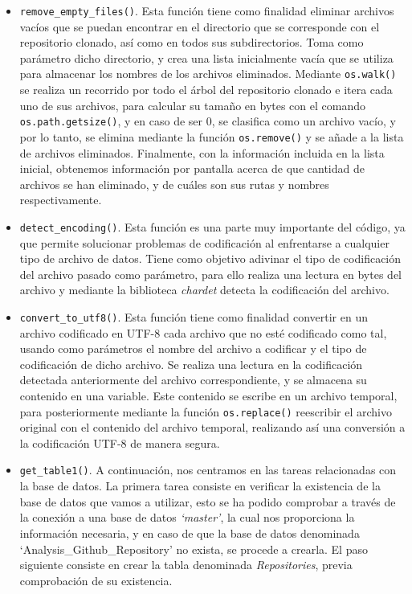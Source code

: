 \documentclass[a4paper, 12pt]{book}
\begin{document}
\begin{itemize}
  \item \texttt{remove\_empty\_files()}. Esta función tiene como finalidad eliminar archivos vacíos que se puedan encontrar en el directorio que se corresponde con el repositorio clonado, así como en todos sus subdirectorios.
  Toma como parámetro dicho directorio, y crea una lista inicialmente vacía que se utiliza para almacenar los nombres de los archivos eliminados. Mediante \texttt{os.walk()} se realiza un recorrido por todo el árbol del repositorio
  clonado e itera cada uno de sus archivos, para calcular su tamaño en bytes con el comando \texttt{os.path.getsize()}, y en caso de ser 0, se clasifica como un archivo vacío, y por lo tanto, se elimina mediante la función \texttt{os.remove()}
  y se añade a la lista de archivos eliminados. Finalmente, con la información incluida en la lista inicial, obtenemos información por pantalla acerca de que cantidad de archivos se han eliminado, y de cuáles son sus rutas y nombres respectivamente.
  
  \item \texttt{detect\_encoding()}. Esta función es una parte muy importante del código, ya que permite solucionar problemas de codificación al enfrentarse a cualquier tipo de archivo de datos. Tiene como objetivo adivinar el tipo de
  codificación del archivo pasado como parámetro, para ello realiza una lectura en bytes del archivo y mediante la biblioteca \textit{chardet} detecta la codificación del archivo.
  
  \item \texttt{convert\_to\_utf8()}. Esta función tiene como finalidad convertir en un archivo codificado en UTF-8 cada archivo que no esté codificado como tal, usando como parámetros el nombre del archivo a codificar y el tipo de codificación de dicho archivo.
  Se realiza una lectura en la codificación detectada anteriormente del archivo correspondiente, y se almacena su contenido en una variable. Este contenido se escribe en un archivo temporal, para posteriormente mediante la función \texttt{os.replace()}
  reescribir el archivo original con el contenido del archivo temporal, realizando así una conversión a la codificación UTF-8 de manera segura. 

  \item \texttt{get\_table1()}. A continuación, nos centramos en las tareas relacionadas con la base de datos. La primera tarea consiste en verificar la existencia de la base de datos que vamos a utilizar, esto se ha podido comprobar a través de la conexión a una base de datos
  \textit{`master'}, la cual nos proporciona la información necesaria, y en caso de que la base de datos denominada `Analysis\_Github\_Repository' no exista, se procede a crearla. El paso siguiente consiste en crear la tabla denominada \textit{Repositories}, previa comprobación de su existencia.
  

\end{itemize}
\end{document}
